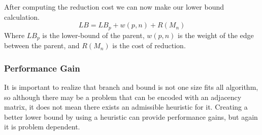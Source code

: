     After computing the reduction cost we can now make our lower bound calculation.
    \begin{equation}
        LB = LB_p + w(p, n) + R(M_n)
    \end{equation}
    Where $LB_p$ is the lower-bound of the parent, $w(p, n)$ is the weight of the edge
    between the parent, and $R(M_n)$ is the cost of reduction.

    \subsubsection{Performance Gain}
    It is important to realize that branch and bound is not one size fits all algorithm, so
    although there may be a problem that can be encoded with an adjacency matrix, it does not mean
    there exists an admissible heuristic for it. Creating a better lower bound by using a heuristic
    can provide performance gains, but again it is problem dependent.


